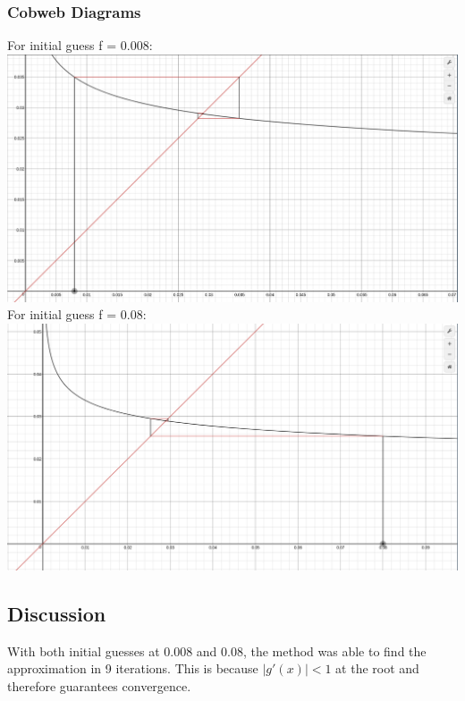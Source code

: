 \documentclass{article}
\begin{document}
    \subsubsection{Cobweb Diagrams}
    For initial guess f = 0.008: \\
    \includegraphics[scale=0.2]{second.png}\\
    For initial guess f = 0.08: \\
    \includegraphics[scale=0.2]{first.png}\\
    \subsection{Discussion}
    With both initial guesses at 0.008 and 0.08, the method was able to find the approximation in 9 iterations. This is because ${|g'(x)| < 1}$ at the root and therefore guarantees convergence.
	
\end{document}
